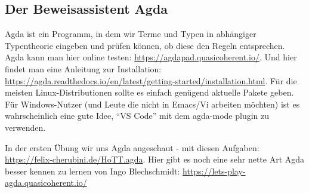\subsection{Der Beweisassistent Agda}
Agda ist ein Programm, in dem wir Terme und Typen in abhängiger Typentheorie eingeben und prüfen können, ob diese den Regeln entsprechen. Agda kann man hier online testen: \url{https://agdapad.quasicoherent.io/}. Und hier findet man eine Anleitung zur Installation: \url{https://agda.readthedocs.io/en/latest/getting-started/installation.html}. Für die meisten Linux-Distributionen sollte es einfach genügend aktuelle Pakete geben. Für Windows-Nutzer (und Leute die nicht in Emacs/Vi arbeiten möchten) ist es wahrscheinlich eine gute Idee, ``VS Code'' mit dem agda-mode plugin zu verwenden.

In der ersten Übung wir uns Agda angeschaut - mit diesen Aufgaben: \url{https://felix-cherubini.de/HoTT.agda}.
Hier gibt es noch eine sehr nette Art Agda besser kennen zu lernen von Ingo Blechschmidt:
\url{https://lets-play-agda.quasicoherent.io/}
